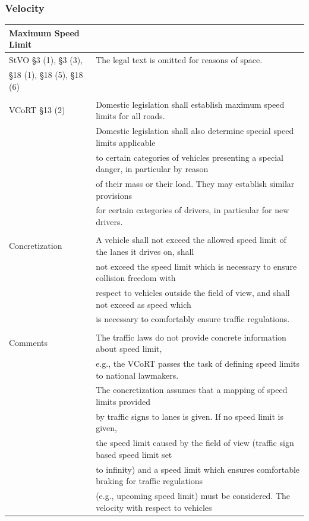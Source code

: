 \subsubsection{Velocity}
\begin{table}[H]
\centering
\begin{tabular}[t]{ll}
\toprule
\textbf{Maximum Speed Limit} &\\
\midrule
	StVO \S 3 (1), \S 3 (3),  & The legal text is omitted for reasons of space.\\
	\S 18 (1), \S 18 (5), \S 18 (6) & \\
	&\\
	VCoRT \S 13 (2) &  Domestic legislation shall establish maximum speed limits for all roads. \\
	& Domestic legislation shall also determine special speed limits applicable \\ 
	& to certain categories of vehicles presenting a special danger, in particular by reason \\ & of their mass or their  load. They may establish similar provisions \\
	& for certain categories of drivers, in particular for new drivers.\\
	&\\
	Concretization &  A vehicle shall not exceed the allowed speed limit of the lanes it drives on, shall \\
	& not exceed the speed limit which is necessary to ensure collision freedom with \\
	& respect to vehicles outside the field of view, and shall not exceed as speed which \\
	& is necessary to comfortably ensure traffic regulations.\\
	&\\
	Comments &  The traffic laws do not provide concrete information about speed limit, \\ 
	& e.g., the VCoRT passes the task of defining speed limits to national lawmakers. \\
	& The concretization assumes that a mapping of speed limits provided \\ 
	& by traffic signs to lanes is given. If no speed limit is given, \\ 
	& the speed limit caused by the field of view (traffic sign based speed limit set \\ 
	& to infinity) and a speed limit which ensures comfortable braking for traffic regulations \\
	& (e.g., upcoming speed limit) must be considered. The velocity with respect to vehicles \\

\end{tabular}
\end{table}
